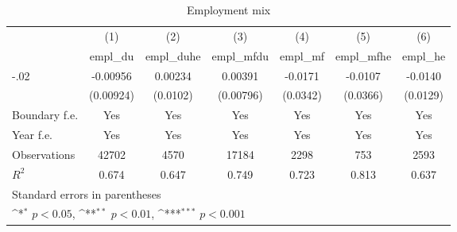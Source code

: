 \begin{table}[htbp]\centering
\def\sym#1{\ifmmode^{#1}\else\(^{#1}\)\fi}
\caption{Employment mix}
\begin{tabular}{l*{6}{c}}
\hline\hline
                    &\multicolumn{1}{c}{(1)}&\multicolumn{1}{c}{(2)}&\multicolumn{1}{c}{(3)}&\multicolumn{1}{c}{(4)}&\multicolumn{1}{c}{(5)}&\multicolumn{1}{c}{(6)}\\
                    &\multicolumn{1}{c}{empl\_du}&\multicolumn{1}{c}{empl\_duhe}&\multicolumn{1}{c}{empl\_mfdu}&\multicolumn{1}{c}{empl\_mf}&\multicolumn{1}{c}{empl\_mfhe}&\multicolumn{1}{c}{empl\_he}\\
\hline
-.02                &    -0.00956         &     0.00234         &     0.00391         &     -0.0171         &     -0.0107         &     -0.0140         \\
                    &   (0.00924)         &    (0.0102)         &   (0.00796)         &    (0.0342)         &    (0.0366)         &    (0.0129)         \\
[1em]
Boundary f.e.       &         Yes         &         Yes         &         Yes         &         Yes         &         Yes         &         Yes         \\
[1em]
Year f.e.           &         Yes         &         Yes         &         Yes         &         Yes         &         Yes         &         Yes         \\
\hline
Observations        &       42702         &        4570         &       17184         &        2298         &         753         &        2593         \\
\(R^{2}\)           &       0.674         &       0.647         &       0.749         &       0.723         &       0.813         &       0.637         \\
\hline\hline
\multicolumn{7}{l}{\footnotesize Standard errors in parentheses}\\
\multicolumn{7}{l}{\footnotesize \sym{*} \(p<0.05\), \sym{**} \(p<0.01\), \sym{***} \(p<0.001\)}\\
\end{tabular}
\end{table}
